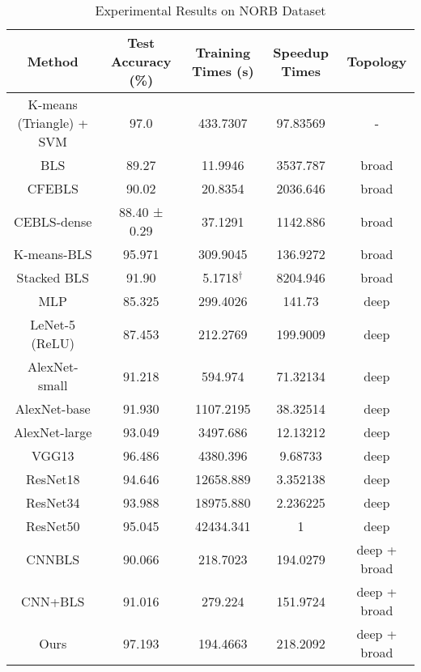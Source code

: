 \documentclass[lettersize,journal]{IEEEtran}
\begin{document}
\begin{table*}[!t]
\caption{Experimental Results on NORB Dataset\label{tab:norb}}
\centering
\begin{tabular}{c c c c c}
\hline\hline
Method & Test Accuracy (\%) & Training Times (s) & Speedup Times & Topology\\
\hline
K-means (Triangle) + SVM \cite{coates2011analysis} & 97.0 & 433.7307 & 97.83569 & - \\
\hline
BLS \cite{chen2017broad} & 89.27 & 11.9946 & 3537.787 & broad \\
CFEBLS \cite{chen2018universal} & 90.02 & 20.8354 & 2036.646 & broad \\
CEBLS-dense \cite{zhang2020analysis} & 88.40 ± 0.29 & 37.1291 & 1142.886 & broad \\
K-means-BLS \cite{liu2017broad} & 95.971 & 309.9045 & 136.9272 & broad \\
Stacked BLS \cite{liu2020stacked} & 91.90 & 5.1718$^\dag$ & 8204.946 & broad \\
\hline
MLP \cite{bishop2006pattern} & 85.325 & 299.4026 & 141.73 & deep \\
LeNet-5 (ReLU) \cite{lecun1989handwritten} & 87.453 & 212.2769 & 199.9009 & deep \\
AlexNet-small \cite{krizhevsky2012imagenet} & 91.218 & 594.974 & 71.32134 & deep \\
AlexNet-base \cite{krizhevsky2012imagenet} & 91.930 & 1107.2195 & 38.32514 & deep \\
AlexNet-large \cite{krizhevsky2012imagenet} & 93.049 & 3497.686 & 12.13212 & deep \\
VGG13 \cite{simonyan2014very} & 96.486 & 4380.396 & 9.68733 & deep \\
ResNet18 \cite{he2016deep} & 94.646 & 12658.889 & 3.352138 & deep \\
ResNet34 \cite{he2016deep} & 93.988 & 18975.880 & 2.236225 & deep \\
ResNet50 \cite{he2016deep} & 95.045 & 42434.341 & 1 & deep \\
\hline
CNNBLS \cite{yang2018cnn} & 90.066 & 218.7023 & 194.0279 & deep + broad \\
CNN+BLS \cite{li2019cnn} & 91.016 & 279.224 & 151.9724 & deep + broad \\
Ours & 97.193 & 194.4663 & 218.2092 & deep + broad \\
\hline\hline
\end{tabular}
\end{table*}
\end{document}
